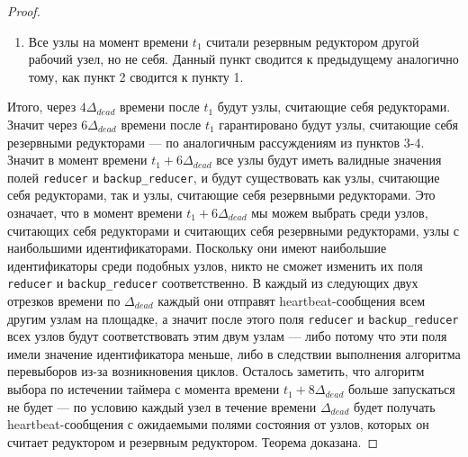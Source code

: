 \begin{proof}
\begin{enumerate}
        \item Все узлы на момент времени $t_1$ считали резервным редуктором другой рабочий узел, но не себя. Данный пункт сводится к предыдущему аналогично тому, как пункт 2 сводится к пункту 1.
    \end{enumerate}
    
    Итого, через $4\Delta_{dead}$ времени после $t_1$ будут узлы, считающие себя редукторами. Значит через $6\Delta_{dead}$ времени после $t_1$ гарантировано будут узлы, считающие себя резервными редукторами --- по аналогичным рассуждениям из пунктов 3-4. Значит в момент времени $t_1 + 6\Delta_{dead}$ все узлы будут иметь валидные значения полей \texttt{reducer} и \texttt{backup\_reducer}, и будут существовать как узлы, считающие себя редукторами, так и узлы, считающие себя резервными редукторами. Это означает, что в момент времени $t_1 + 6\Delta_{dead}$ мы можем выбрать среди узлов, считающих себя редукторами и считающих себя резервными редукторами, узлы с наибольшими идентификаторами. Поскольку они имеют наибольшие идентификаторы среди подобных узлов, никто не сможет изменить их поля \texttt{reducer} и \texttt{backup\_reducer} соответственно. В каждый из следующих двух отрезков времени по $\Delta_{dead}$ каждый они отправят heartbeat-со\-об\-ще\-ния всем другим узлам на площадке, а значит после этого поля \texttt{reducer} и \texttt{backup\_reducer} всех узлов будут соответствовать этим двум узлам --- либо потому что эти поля имели значение идентификатора меньше, либо в следствии выполнения алгоритма перевыборов из-за возникновения циклов. Осталось заметить, что алгоритм выбора по истечении таймера с момента времени $t_1 + 8\Delta_{dead}$ больше запускаться не будет --- по условию каждый узел в течение времени $\Delta_{dead}$ будет получать heartbeat-со\-об\-ще\-ния с ожидаемыми полями состояния от узлов, которых он считает редуктором и резервным редуктором. Теорема доказана.
\end{proof}

